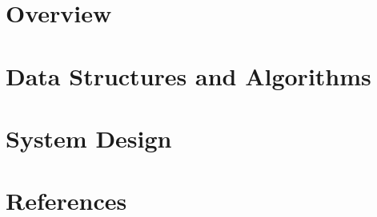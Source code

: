 \section[Overview]{Overview}



\section[DSA]{Data Structures and Algorithms}


\section[Sys]{System Design}


\section[Refs]{References}


